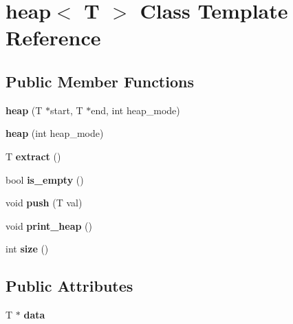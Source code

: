 \hypertarget{classheap}{\section{heap$<$ T $>$ Class Template Reference}
\label{classheap}
}
\subsection*{Public Member Functions}
\begin{DoxyCompactItemize}
\item 
\hypertarget{classheap_ae5b880117e3a0088a031bd911d006d84}{{\bfseries heap} (T $\ast$start, T $\ast$end, int heap\+\_\+mode)}\label{classheap_ae5b880117e3a0088a031bd911d006d84}

\item 
\hypertarget{classheap_a22aee3b8d08813cfe705d0929e61be09}{{\bfseries heap} (int heap\+\_\+mode)}\label{classheap_a22aee3b8d08813cfe705d0929e61be09}

\item 
\hypertarget{classheap_a3840fbe90d6f0c21d96c295fd94898ff}{T {\bfseries extract} ()}\label{classheap_a3840fbe90d6f0c21d96c295fd94898ff}

\item 
\hypertarget{classheap_a4b6d199773a4124191bc8505e5a538c3}{bool {\bfseries is\+\_\+empty} ()}\label{classheap_a4b6d199773a4124191bc8505e5a538c3}

\item 
\hypertarget{classheap_a45710dd4c8005b019b9ee6ec3d50579a}{void {\bfseries push} (T val)}\label{classheap_a45710dd4c8005b019b9ee6ec3d50579a}

\item 
\hypertarget{classheap_a8d926d267de848799d7ac811de12865b}{void {\bfseries print\+\_\+heap} ()}\label{classheap_a8d926d267de848799d7ac811de12865b}

\item 
\hypertarget{classheap_a82d140c696c3f24fe7ce7dc8ca40cc04}{int {\bfseries size} ()}\label{classheap_a82d140c696c3f24fe7ce7dc8ca40cc04}

\end{DoxyCompactItemize}
\subsection*{Public Attributes}
\begin{DoxyCompactItemize}
\item 
\hypertarget{classheap_a0ae2eec6afa540480fdde98571f46084}{T $\ast$ {\bfseries data}}\label{classheap_a0ae2eec6afa540480fdde98571f46084}

\end{DoxyCompactItemize}


